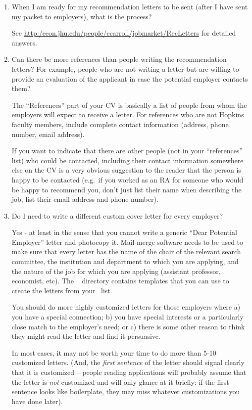 \documentclass{econtex}
\begin{document}
\begin{enumerate}
\item {} 
When I am ready for my recommendation letters to be sent (after I have
sent my packet to employers), what is the process?

See \url{http:/econ.jhu.edu/people/ccarroll/jobmarket/RecLetters} for detailed answers.


\item  Can there be more references than people writing the recommendation 
 letters? For example, people who are not writing a letter but are willing to provide 
 an evaluation of the applicant in case the potential employer contacts them?

 The ``References'' part of your CV is basically a list of people from
 whom the employers will expect to receive a letter.  For references who
 are not Hopkins faculty members, include complete contact information
 (address, phone number, email address).

 If you want to indicate that there are other people (not in your
 ``references'' list) who could be contacted, including their contact
 information somewhere else on the CV is a very obvious suggestion to
 the reader that the person is happy to be contacted (e.g.\ if you
 worked as an RA for someone who would be happy to recommend you,
 don't just list their name when describing the job, list their email
 address and phone number).


\item Do I need to write a different custom cover letter for every employer?
  
  Yes - at least in the sense that you cannot write a generic ``Dear Potential Employer'' letter
  and photocopy it.  Mail-merge software needs to be used to make sure
  that every letter has the name of the chair of the relevant search
  committee, the institution and department to which you are applying,
  and the nature of the job for which you are applying (assistant
  professor, economist, etc).  The \Templates~ directory contains templates that 
you can use to create the letters from your \EM~list.  
  
  You should do more highly customized letters for those employers
  where a) you have a special connection; b) you have special
  interests or a particularly close match to the employer's need; or
  c) there is some other reason to think they might read the letter
  and find it persuasive.  

  In most cases, it may not be worth your time to do more than
  5-10 customized letters.  (And, the {\it first sentence} of the letter should signal
clearly that it is customized -- people reading applications will probably assume that the letter is {\it not} customized and will only glance at it briefly; if the first sentence looks like boilerplate, they may miss whatever customizations you have done later).


\end{enumerate}
\end{document}

